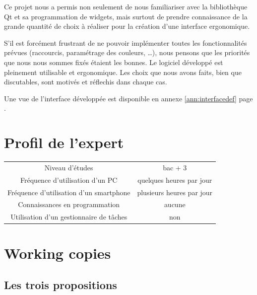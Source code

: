 \documentclass[11pt]{article}
\begin{document}
Ce projet nous a permis non seulement de nous familiariser avec la
bibliothèque Qt et sa programmation de widgets, mais surtout de
prendre connaissance de la grande quantité de choix à réaliser pour la
création d'une interface ergonomique.

S'il est forcément frustrant de ne pouvoir implémenter toutes les
fonctionnalités prévues (raccourcis, paramétrage des couleurs, \dots),
nous pensons que les priorités que nous nous sommes fixés étaient les
bonnes. Le logiciel développé est pleinement utilisable et
ergonomique. Les choix que nous avons faits, bien que discutables,
sont motivés et réflechis dans chaque cas.

Une vue de l'interface développée est disponible en annexe
\ref{ann:interfacedef} page \pageref{fig:interfacedefscreen}.


\printglossaries

\appendix

\section{Profil de l'expert}
\label{sec:profilExpert}

\begin{tabular}[h]{c|c}
  Niveau d'études & bac + 3\\
  Fréquence d'utilisation d'un PC & quelques heures par jour\\
  Fréquence d'utilisation d'un smartphone & plusieurs heures par jour\\
  Connaissances en programmation & aucune\\
  Utilisation d'un gestionnaire de tâches & non\\

\end{tabular}

\section{Working copies}

\subsection{Les trois propositions}
\label{ann:props}
\end{document}
